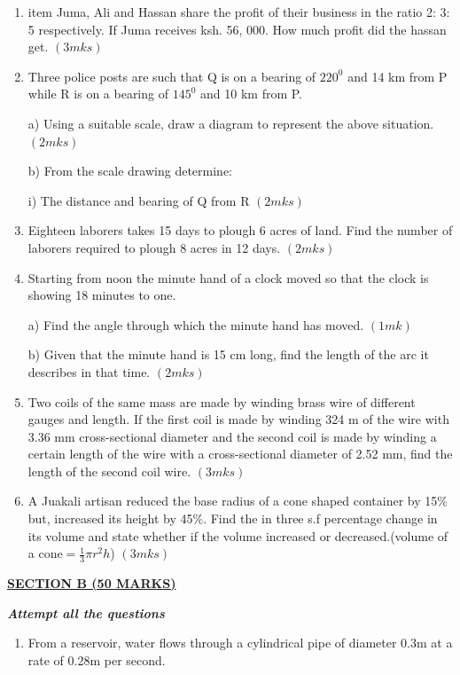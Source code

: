 \documentclass[
  a4paperpaper,
]{scrbook}
\begin{document}
\begin{tcolorbox}
\begin{enumerate}
\def\labelenumi{\arabic{enumi}.}
\setcounter{enumi}{10}
\item
  item Juma, Ali and Hassan share the profit of their business in the
  ratio 2: 3: 5 respectively. If Juma receives ksh. 56, 000. How much
  profit did the hassan get. \((3mks)\)
\item
  Three police posts are such that Q is on a bearing of \(220^0\) and 14
  km from P while R is on a bearing of \(145^0\) and 10 km from P.

  a) Using a suitable scale, draw a diagram to represent the above
  situation. \((2mks)\)

  b) From the scale drawing determine:

  i) The distance and bearing of Q from R \((2mks)\)
\item
  Eighteen laborers takes 15 days to plough 6 acres of land. Find the
  number of laborers required to plough 8 acres in 12 days. \((2mks)\)
\item
  Starting from noon the minute hand of a clock moved so that the clock
  is showing 18 minutes to one.

  a) Find the angle through which the minute hand has moved. \((1mk)\)

  b) Given that the minute hand is 15 cm long, find the length of the
  arc it describes in that time. \((2mks)\)
\item
  Two coils of the same mass are made by winding brass wire of different
  gauges and length. If the first coil is made by winding 324 m of the
  wire with 3.36 mm cross-sectional diameter and the second coil is made
  by winding a certain length of the wire with a cross-sectional
  diameter of 2.52 mm, find the length of the second coil wire.
  \((3mks)\)
\item
  A Juakali artisan reduced the base radius of a cone shaped container
  by 15\% but, increased its height by 45\%. Find the in three s.f
  percentage change in its volume and state whether if the volume
  increased or decreased.(volume of a cone\(=\frac{1}{3}\pi r^2h\))
  \((3mks)\)
\end{enumerate}

\ul{\textbf{SECTION B (50 MARKS)}}

\textbf{\emph{Attempt all the questions}}

\begin{enumerate}
\def\labelenumi{\arabic{enumi}.}
\setcounter{enumi}{16}
\item
  From a reservoir, water flows through a cylindrical pipe of diameter
  0.3m at a rate of 0.28m per second.


\end{enumerate}
\end{tcolorbox}
\end{document}
